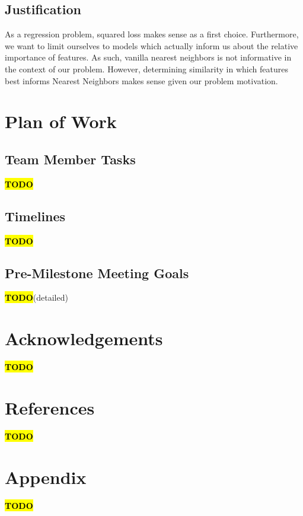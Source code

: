 \documentclass{article}
\newcommand{\TODO}{\textcolor{red}{\textbf{\hl{TODO}}}}
\begin{document}
\begin{multicols}{2}
\subsection{Justification} As a regression problem, squared loss makes sense as a first choice. Furthermore, we want to limit ourselves to models which actually inform us about the relative importance of features. As such, vanilla nearest neighbors is not informative in the context of our problem. However, determining similarity in which features best informs Nearest Neighbors makes sense given our problem motivation.

\section{Plan of Work}
\subsection{Team Member Tasks} \TODO
\subsection{Timelines} \TODO
\subsection{Pre-Milestone Meeting Goals} \TODO (detailed)

\section{Acknowledgements} \TODO

\end{multicols}

\pagebreak

\section{References} \TODO

\section{Appendix} \TODO
\end{document}
